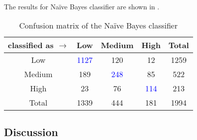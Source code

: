 The results for Na\"ive Bayes classifier are shown in .
\begin{table}[H]
	\centering
	\caption{Confusion matrix of the Na\"ive Bayes classifier}
	\label{tab:mat-nb}
	\begin{tabular}[c]{c|ccc||c}
		classified as \(\rightarrow\) & \textbf{Low} & \textbf{Medium} & \textbf{High} & Total\\ \hline
		Low & \textcolor{blue}{1127} & 120 & 12 & 1259 \\
		Medium & 189 & \textcolor{blue}{248} & 85 & 522 \\
		High & 23 & 76 & \textcolor{blue}{114} & 213 \\ \hline \hline
		Total & 1339 & 444 & 181 & 1994 \\
	\end{tabular}
\end{table}

\subsection{Discussion}